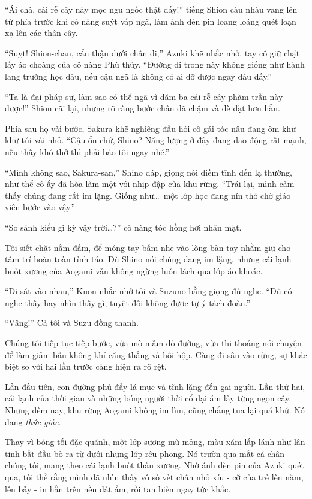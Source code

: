 \documentclass[../main.tex]{subfiles}
\begin{document}
``Ái chà, cái rễ cây này mọc ngu ngốc thật đấy!'' tiếng Shion càu nhàu vang lên từ phía trước khi cô nàng suýt vấp ngã, làm ánh đèn pin loang loáng quét loạn xạ lên các thân cây.

``Suỵt! Shion-chan, cẩn thận dưới chân đi,'' Azuki khẽ nhắc nhở, tay cô giữ chặt lấy áo choàng của cô nàng Phù thủy. ``Đường đi trong này không giống như hành lang trường học đâu, nếu cậu ngã là không có ai đỡ được ngay đâu đấy.''

``Ta là đại pháp sư, làm sao có thể ngã vì dăm ba cái rễ cây phàm trần này được!'' Shion cãi lại, nhưng rõ ràng bước chân đã chậm và dè dặt hơn hẳn.

Phía sau họ vài bước, Sakura khẽ nghiêng đầu hỏi cô gái tóc nâu đang ôm khư khư túi vải nhỏ. ``Cậu ổn chứ, Shino? Năng lượng ở đây đang dao động rất mạnh, nếu thấy khó thở thì phải báo tôi ngay nhé.''

``Mình không sao, Sakura-san,'' Shino đáp, giọng nói điềm tĩnh đến lạ thường, như thể cô ấy đã hòa làm một với nhịp đập của khu rừng. ``Trái lại, mình cảm thấy chúng đang rất im lặng. Giống như\dots\ một lớp học đang nín thở chờ giáo viên bước vào vậy.''

``So sánh kiểu gì kỳ vậy trời\dots?'' cô nàng tóc hồng hơi nhăn mặt.

Tôi siết chặt nắm đấm, để móng tay bấm nhẹ vào lòng bàn tay nhằm giữ cho tâm trí hoàn toàn tỉnh táo. Dù Shino nói chúng đang im lặng, nhưng cái lạnh buốt xương của Aogami vẫn không ngừng luồn lách qua lớp áo khoác.

``Đi sát vào nhau,'' Kuon nhắc nhở tôi và Suzuno bằng giọng đủ nghe. ``Dù có nghe thấy hay nhìn thấy gì, tuyệt đối không được tự ý tách đoàn.''

``Vâng!'' Cả tôi và Suzu đồng thanh.

Chúng tôi tiếp tục tiếp bước, vừa mò mẫm dò đường, vừa thi thoảng nói chuyện để làm giảm bầu không khí căng thẳng và hồi hộp. Càng đi sâu vào rừng, sự khác biệt so với hai lần trước càng hiện ra rõ rệt.

Lần đầu tiên, con đường phủ đầy lá mục và tĩnh lặng đến gai người. Lần thứ hai, cái lạnh của thời gian và những bóng người thời cổ đại ám lấy từng ngọn cây. Nhưng đêm nay, khu rừng Aogami không im lìm, cũng chẳng tua lại quá khứ. Nó đang \textit{thức giấc}.

Thay vì bóng tối đặc quánh, một lớp sương mù mỏng, màu xám lấp lánh như lân tinh bắt đầu bò ra từ dưới những lớp rêu phong. Nó trườn qua mắt cá chân chúng tôi, mang theo cái lạnh buốt thấu xương. Nhờ ánh đèn pin của Azuki quét qua, tôi thề rằng mình đã nhìn thấy vô số vết chân nhỏ xíu - cỡ của trẻ lên năm, lên bảy - in hằn trên nền đất ẩm, rồi tan biến ngay tức khắc.
\end{document}

